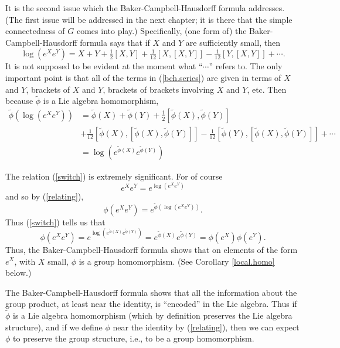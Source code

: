 \documentclass[12pt]{amsbook}
\theoremstyle{plain}
\numberwithin{equation}{chapter}
\numberwithin{theorem}{chapter}
\begin{document}
It is the second issue which the Baker-Campbell-Hausdorff formula addresses.
(The first issue will be addressed in the next chapter; it is there that the
simple connectedness of $G$ comes into play.) Specifically, (one form of) the
Baker-Campbell-Hausdorff formula says that if $X$ and $Y$ are sufficiently
small, then
\begin{equation}
\log(e^{X}e^{Y})=X+Y+\tfrac{1}{2}[X,Y]+\tfrac{1}{12}[X,[X,Y]]-\tfrac{1}%
{12}[Y,[X,Y]]+\cdots\text{.}\label{bch.series}%
\end{equation}
It is not supposed to be evident at the moment what ``$\cdots$'' refers to.
The only important point is that all of the terms in (\ref{bch.series}) are
given in terms of $X$ and $Y$, brackets of $X$ and $Y$, brackets of brackets
involving $X$ and $Y$, etc. Then because $\widetilde{\phi}$ is a Lie algebra
homomorphism,
\begin{align}
\widetilde{\phi}\left(  \log\left(  e^{X}e^{Y}\right)  \right)   &
=\widetilde{\phi}(X)+\widetilde{\phi}(Y)+\tfrac{1}{2}[\widetilde{\phi
}(X),\widetilde{\phi}(Y)]\nonumber\\
& +\tfrac{1}{12}[\widetilde{\phi}(X),[\widetilde{\phi}(X),\widetilde{\phi
}(Y)]]-\tfrac{1}{12}[\widetilde{\phi}(Y),[\widetilde{\phi}(X),\widetilde{\phi
}(Y)]]+\cdots\nonumber\\
& =\log\left(  e^{\widetilde{\phi}(X)}e^{\widetilde{\phi}(Y)}\right)
\label{switch}%
\end{align}

The relation (\ref{switch}) is extremely significant. For of course
\[
e^{X}e^{Y}=e^{\log(e^{X}e^{Y})}%
\]
and so by (\ref{relating}),
\[
\phi\left(  e^{X}e^{Y}\right)  =e^{\widetilde{\phi}(\log(e^{X}e^{Y}))}\text{.}%
\]
Thus (\ref{switch}) tells us that
\[
\phi\left(  e^{X}e^{Y}\right)  =e^{\log\left(  e^{\widetilde{\phi}%
(X)}e^{\widetilde{\phi}(Y)}\right)  }=e^{\widetilde{\phi}(X)}e^{\widetilde
{\phi}(Y)}=\phi(e^{X})\phi(e^{Y})\text{.}%
\]
Thus, the Baker-Campbell-Hausdorff formula shows that on elements of the form
$e^{X}$, with $X$ small, $\phi$ is a group homomorphism. (See Corollary
\ref{local.homo} below.)

The Baker-Campbell-Hausdorff formula shows that all the information about the
group product, at least near the identity, is ``encoded'' in the Lie algebra.
Thus if $\widetilde{\phi}$ is a Lie algebra homomorphism (which by definition
preserves the Lie algebra structure), and if we define $\phi$ near the
identity by (\ref{relating}), then we can expect $\phi$ to preserve the group
structure, i.e., to be a group homomorphism.
\end{document}
